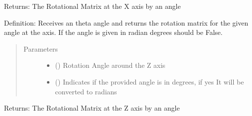 \documentclass[letterpaper,10pt,english]{sphinxmanual}
\begin{document}
\begin{fulllineitems}
\begin{fulllineitems}
\begin{quote}
\begin{description}
\begin{itemize}
\end{itemize}

\end{description}\end{quote}

Returns: The Rotational Matrix at the X axis by an  angle

\end{fulllineitems}


\begin{fulllineitems}
\label{\detokenize{rst/MatrixManipulation:MatrixManipulation.Matrix.rot_y}}
Definition: Receives an theta angle and returns the rotation matrix for the given angle at the  axis.
If the angle is given in radian degrees should be False.
\begin{quote}\begin{description}
\item[{Parameters}] \leavevmode\begin{itemize}
\item {} 
 () \textendash{} Rotation Angle around the Z axis

\item {} 
 () \textendash{} Indicates if the provided angle is in degrees, if yes It will be converted to radians

\end{itemize}

\end{description}\end{quote}

Returns: The Rotational Matrix at the Z axis by an  angle

\end{fulllineitems}



\end{fulllineitems}
\end{document}
